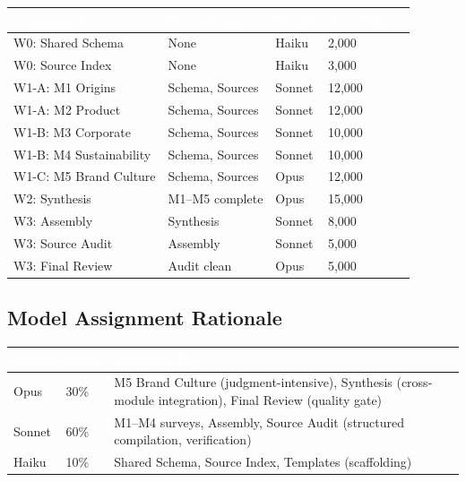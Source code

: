 \documentclass[11pt,letterpaper]{article}
\newcommand{\tableheader}[1]{\textbf{\sffamily\textcolor{white}{#1}}}
\begin{document}
\begin{center}
\begin{tabularx}{\textwidth}{L{3.5cm}L{2.5cm}C{1.5cm}C{2cm}}
\toprule
{}
\tableheader{Component} & \tableheader{Dependencies} & \tableheader{Model} & \tableheader{Est.\ Tokens} \\
\midrule
W0: Shared Schema & None & Haiku & 2,000 \\
W0: Source Index & None & Haiku & 3,000 \\
W1-A: M1 Origins & Schema, Sources & Sonnet & 12,000 \\
W1-A: M2 Product & Schema, Sources & Sonnet & 12,000 \\
W1-B: M3 Corporate & Schema, Sources & Sonnet & 10,000 \\
W1-B: M4 Sustainability & Schema, Sources & Sonnet & 10,000 \\
W1-C: M5 Brand Culture & Schema, Sources & Opus & 12,000 \\
W2: Synthesis & M1--M5 complete & Opus & 15,000 \\
W3: Assembly & Synthesis & Sonnet & 8,000 \\
W3: Source Audit & Assembly & Sonnet & 5,000 \\
W3: Final Review & Audit clean & Opus & 5,000 \\
\bottomrule
\end{tabularx}
\end{center}

\subsection{Model Assignment Rationale}

\begin{center}
\begin{tabularx}{\textwidth}{C{1.5cm}C{1.5cm}X}
\toprule
{}
\tableheader{Model} & \tableheader{Share} & \tableheader{Assigned To} \\
\midrule
Opus & 30\% & M5 Brand Culture (judgment-intensive), Synthesis (cross-module integration), Final Review (quality gate) \\
Sonnet & 60\% & M1--M4 surveys, Assembly, Source Audit (structured compilation, verification) \\
Haiku & 10\% & Shared Schema, Source Index, Templates (scaffolding) \\
\bottomrule
\end{tabularx}
\end{center}
\end{document}
